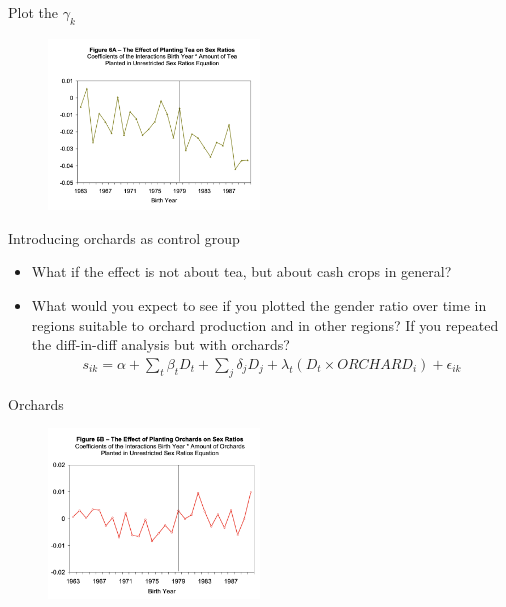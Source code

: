 \documentclass[11pt,notes=hide,aspectratio=169,mathserif]{beamer}
\begin{document}
\begin{frame}{Plot the $\gamma_k$}
\begin{figure}
\centering
\includegraphics[width=0.5\textwidth]{inputs/tea.png}
\end{figure}
\end{frame}

\begin{frame}{Introducing orchards as control group}
\begin{itemize}
\item What if the effect is not about tea, but about cash crops in general?
\item What would you expect to see if you plotted the gender ratio over time in regions suitable to orchard production and in other regions?
If you repeated the diff-in-diff analysis but with orchards?
\begin{align*}
s_{ik} = \alpha + \sum_t \beta_t D_t + \sum_j \delta_j D_j + \lambda_t (D_t \times ORCHARD_i) + \epsilon_{ik}
\end{align*}
\end{itemize}
\end{frame}

\begin{frame}{Orchards}
\begin{figure}
\centering
\includegraphics[width=0.5\textwidth]{inputs/orchards.png}
\end{figure}
\end{frame}
\end{document}
